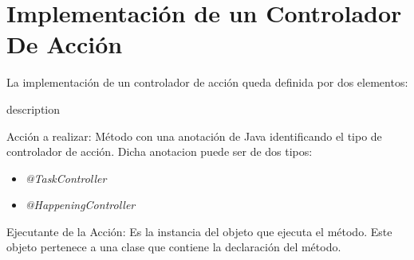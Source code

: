 \section{Implementación de un Controlador De Acción}
\label{sec:implementacion_controlador_accion}
La implementación de un controlador de acción queda definida por dos elementos:
\begin{labeling}{description}
  \item [Acción a realizar: ] Método con una anotación de Java
  identificando el tipo de controlador de acción. 
  Dicha anotacion puede ser de dos tipos:
  \begin{itemize}
    \item \emph{@TaskController}
    \item \emph{@HappeningController}
  \end{itemize}
  \item [Ejecutante de la Acción: ] Es la instancia del objeto que ejecuta el
  método. Este objeto pertenece a una clase que contiene la declaración
  del método.
\end{labeling}

